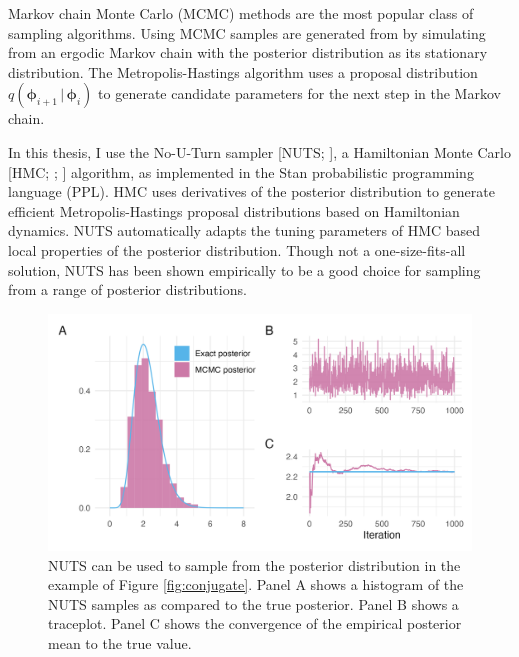\documentclass[a4paper, nobind]{templates/ociamthesis}
\begin{document}
Markov chain Monte Carlo (MCMC) methods \autocite{roberts2004general} are the most popular class of sampling algorithms.
Using MCMC samples are generated from by simulating from an ergodic Markov chain with the posterior distribution as its stationary distribution.
The Metropolis-Hastings \autocite{metropolis1953equation,hastings1970monte} algorithm uses a proposal distribution \(q(\boldsymbol{\mathbf{\phi}}_{i + 1} \, | \, \boldsymbol{\mathbf{\phi}}_i)\) to generate candidate parameters for the next step in the Markov chain.

In this thesis, I use the No-U-Turn sampler {[}NUTS; \textcite{hoffman2014no}{]}, a Hamiltonian Monte Carlo {[}HMC; \textcite{duane1987hybrid}; \textcite{neal2011mcmc}{]} algorithm, as implemented in the Stan \autocite{carpenter2017stan} probabilistic programming language (PPL).
HMC uses derivatives of the posterior distribution to generate efficient Metropolis-Hastings proposal distributions based on Hamiltonian dynamics.
NUTS automatically adapts the tuning parameters of HMC based local properties of the posterior distribution.
Though not a one-size-fits-all solution, NUTS has been shown empirically to be a good choice for sampling from a range of posterior distributions.



\begin{figure}

{\centering \includegraphics[width=0.95\linewidth]{figures/bayesian/stan} 

}

\caption{NUTS can be used to sample from the posterior distribution in the example of Figure \ref{fig:conjugate}. Panel A shows a histogram of the NUTS samples as compared to the true posterior. Panel B shows a traceplot. Panel C shows the convergence of the empirical posterior mean to the true value.}\label{fig:stan}
\end{figure}
\end{document}
